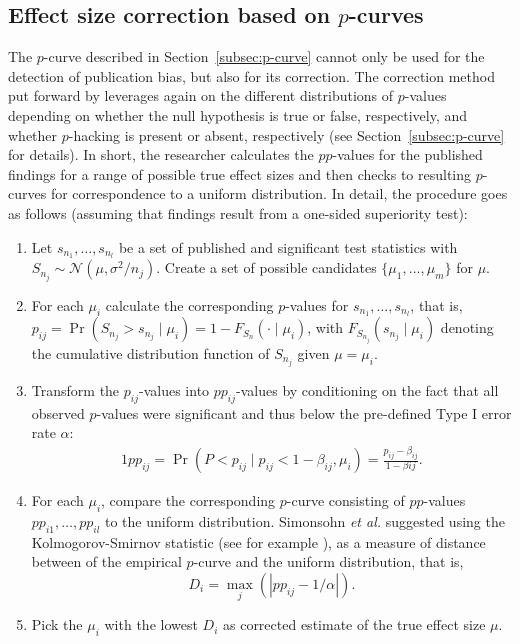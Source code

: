 \subsection{Effect size correction based on \texorpdfstring{$p$}{p}-curves}
The $p$-curve described in Section~\ref{subsec:p-curve} cannot only be used for the detection of publication bias, but also for its correction. The correction method put forward by \citet{simonsohn_pcurve_correction_2014} leverages again on the different distributions of $p$-values depending on whether the null hypothesis is true or false, respectively, and whether $p$-hacking is present or absent, respectively (see Section~\ref{subsec:p-curve} for details). In short, the researcher calculates the $pp$-values for the published findings for a range of possible true effect sizes and then checks to resulting $p$-curves for correspondence to a uniform distribution. In detail, the procedure goes as follows (assuming that findings result from a one-sided superiority test):
\begin{enumerate}
    \item Let $s_{n_1},\dots,s_{n_l}$ be a set of published and significant test statistics with ${S_{n_j}\sim \mathcal{N}(\mu, \sigma^2/n_j)}$. Create a set of possible candidates $\{\mu_1,\dots,\mu_m\}$ for $\mu$.
    \item For each $\mu_i$ calculate the corresponding $p$-values for $s_{n_1},\dots,s_{n_l}$, that is, $p_{ij} = \Pr(S_{n_j} > s_{n_j}\mid \mu_i) = 1-F_{S_n}(\cdot \mid \mu_i)$, with $F_{S_{n_j}}(s_{n_j} \mid \mu_i)$ denoting the cumulative distribution function of $S_{n_j}$ given $\mu = \mu_i$.
    \item Transform the $p_{ij}$-values into $pp_{ij}$-values by conditioning on the fact that all observed $p$-values were significant and thus below the pre-defined Type I error rate $\alpha$:
    \begin{alignat*}{1}
    pp_{ij} = \Pr(P<p_{ij} \mid p_{ij} < 1-\beta_{ij}, \mu_i) = \frac{p_{ij}-\beta_{ij}}{1-\beta{ij}}.
    \end{alignat*}
    \item For each $\mu_i$, compare the corresponding $p$-curve consisting of $pp$-values $pp_{i1},\dots,pp_{il}$ to the uniform distribution. Simonsohn \textit{et al.} suggested using the Kolmogorov-Smirnov statistic (see for example \citet[p.~155]{barlow_statistics_1989}), as a measure of distance between of the empirical $p$-curve and the uniform distribution, that is,
    $$D_i = \max_j(|pp_{ij}-1/\alpha|).$$
    \item Pick the $\mu_i$ with the lowest $D_i$ as corrected estimate of the true effect size $\mu$.
\end{enumerate}
